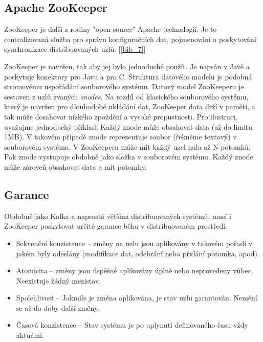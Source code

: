 \documentclass[
  digital, %
  table,   %
  nolof,     %
  nolot,     %
  oneside, %
  nocover,
  monochrome,
  12pt
]{fithesis3}
\begin{document}
\newpage
\subsection{Apache ZooKeeper}
\label{sec:zookeeper}
ZooKeeper je další z rodiny "open-source" Apache technologií. Je to centralizovaná služba pro správu konfiguračních dat, pojmenování a poskytování synchronizace distribuovaných uzlů. [\ref{bib_7}]

ZooKeeper je navržen, tak aby jej bylo jednoduché použít. Je napsán v Javě a poskytuje konektory pro Javu a pro C. Struktura datového modelu je podobná stromovému uspořádání souborového systému. Datový model ZooKeeperu je sestaven z uzlů zvaných \textit{znodes}. Na rozdíl od klasického souborového systému, který je navržen pro dlouhodobé ukládání dat, ZooKeeper data drží v paměti, a tak může dosahovat nízkého zpoždění a vysoké propustnosti. Pro ilustraci, uvažujme jednoduchý příklad: Každý znode může obsahovat data (až do limitu 1MB). V takovém případě znode reprezentuje soubor (řekněme textový) v souborovém systému. V ZooKeeperu může mít každý uzel nula až N potomků. Pak znode vystupuje obdobně jako složka v souborovém systému. Každý znode může zároveň obsahovat data a mít potomky.

\subsection*{Garance}
Obdobně jako Kafka a naprostá většina distribuovaných systémů, musí i ZooKeeper poskytovat určité garance běhu v distribuovaném prostředí.

\begin{itemize}
  \item Sekvenční konzistence -- změny na uzlu jsou aplikovány v takovém pořadí v jakém byly odeslány (modifikace dat, odebrání nebo přidání potomka, apod).
  \item Atomicita -- změny jsou úspěšně aplikovány úplně nebo neprovedeny vůbec. Neexistuje žádný mezistav.
  \item Spolehlivost -- Jakmile je změna aplikována, je stav uzlu garantován. Nemění se až do doby další změny.
  \item Časová konzistence -- Stav systému je po uplynutí definovaného času vždy aktuální.
\end{itemize}
\end{document}
